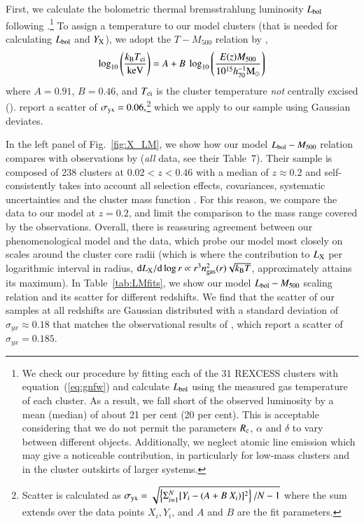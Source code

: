 \documentclass[useAMS,usenatbib]{mn2e}
\newcommand{\dd}{\mathrm{d}}
\begin{document}
First, we calculate the bolometric thermal bremsstrahlung luminosity
$L_{{\mathrm{bol}}}$ following \cite{1988xrec.book.....S}.\footnote{We check our
  procedure by fitting each of the 31 REXCESS clusters with
  equation~(\ref{eq:gnfw}) and calculate $L_{{\mathrm{bol}}}$ using the measured gas
  temperature of each cluster. As a result, we fall short of the observed
  luminosity by a mean (median) of about 21 per cent (20 per cent). This is
  acceptable considering that we do not permit the parameters $R_{{\mathrm{c}}}$,
  $\alpha$ and $\delta$ to vary between different objects. Additionally, we
  neglect atomic line emission which may give a noticeable contribution, in
  particularly for low-mass clusters and in the cluster outskirts of larger
  systems.}  To assign a temperature to our model clusters (that is needed for
calculating $L_{{\mathrm{bol}}}$ and $Y_{{\mathrm{X}}}$), we adopt the $T-M_{500}$
relation by \cite{2010MNRAS.406.1773M},
\begin{equation}
\log_{10} \left( \frac{k_{{\mathrm{B}}}T_{{\mathrm{ci}}}}{{\mathrm{keV}}} \right) = 
A + B~\log_{10} \left( \frac{E(z) M_{500}}{10^{15} h_{70}^{-1} {\mathrm{M_{\odot}}}} \right)
\label{eq:temp}
\end{equation}
where $A=0.91$, $B=0.46$, and $T_{{\mathrm{ci}}}$ is the cluster temperature
\emph{not} centrally excised
(\citealp{2010MNRAS.406.1773M}). \cite{2010MNRAS.406.1773M} report a scatter of
$\sigma_{{\mathrm{yx}}} = 0.06,$\footnote{Scatter is calculated as $\sigma_{{\mathrm{yx}}}
  = \sqrt{ \left\{ \Sigma_{i=1}^{N} [Y_{i}-(A+B~X_{i})]^{2}\right\} / N-1}$
  where the sum extends over the data points $X_{i}, Y_{i}$, and $A$ and $B$ are
  the fit parameters.} which we apply to our sample using Gaussian deviates.

In the left panel of Fig.~\ref{fig:X_LM}, we show how our model
$L_{{\mathrm{bol}}}-M_{500}$ relation compares with observations by
\cite{2010MNRAS.406.1773M} (\emph{all} data, see their Table~7). Their sample is
composed of 238 clusters at $0.02<z<0.46$ with a median of $z \approx 0.2$ and
self-consistently takes into account all selection effects, covariances,
systematic uncertainties and the cluster mass function
\citep{2010MNRAS.406.1759M}.  For this reason, we compare the
\cite{2010MNRAS.406.1773M} data to our model at $z=0.2$, and limit the
comparison to the mass range covered by the observations. Overall, there is
reassuring agreement between our phenomenological model and the data, which
probe our model most closely on scales around the cluster core radii (which is
where the contribution to $L_{{\mathrm{X}}}$ per logarithmic interval in radius, $\dd
L_{\rmn{X}}/\dd\log r \propto r^3 n_{\rm{gas}}^2(r) \sqrt{k_{\rmn{B}}T}$,
approximately attains its maximum).  In Table~\ref{tab:LMfits}, we show our
model $L_{{\mathrm{bol}}}-M_{500}$ scaling relation and its scatter for different
redshifts. We find that the scatter of our samples at all redshifts are Gaussian
distributed with a standard deviation of $\sigma_{yx} \approx 0.18$ that matches
the observational results of \cite{2010MNRAS.406.1773M}, which report a scatter
of $\sigma_{yx} = 0.185$.
\end{document}
